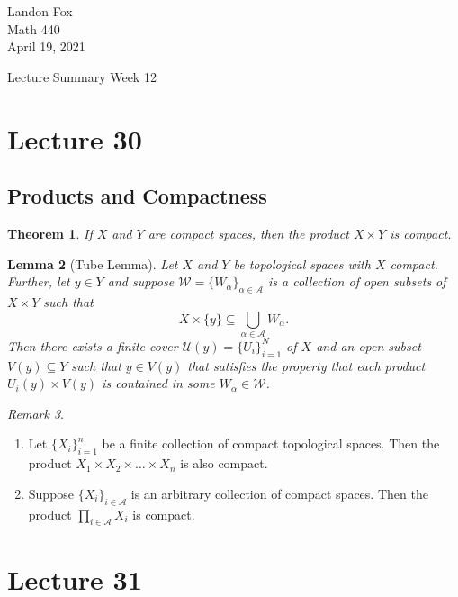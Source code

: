 \documentclass[ 12pt ]{article}
\newcounter{lecture_num}
\theoremstyle{plain}
\theoremstyle{plain}
\newtheorem{theorem}{Theorem}[lecture_num]
\newtheorem{lemma}[theorem]{Lemma}
\theoremstyle{definition}
\theoremstyle{remark}
\newtheorem{remark}[theorem]{Remark}
\begin{document}
\noindent Landon Fox \\
\noindent Math 440 \\
\noindent April 19, 2021

\begin{center}
	\Large Lecture Summary Week 12
\end{center}

\setcounter{lecture_num}{30}
\setcounter{theorem}{0}
\section*{Lecture 30}

\subsection*{Products and Compactness}

\begin{theorem}
	If $X$ and $Y$ are compact spaces, then the product $X \times Y$ is compact.
\end{theorem}

\begin{lemma}[Tube Lemma]
	Let $X$ and $Y$ be topological spaces with $X$ compact. Further, let $y \in Y$ and suppose $\mathcal{W} = \{ W_\alpha \}_{\alpha \in \mathcal{A}}$ is a collection of open subsets of
	$X \times Y$ such that $$X \times \{ y \} \subseteq \bigcup_{\alpha \in \mathcal{A}} W_\alpha.$$ Then there exists a finite cover $\mathcal{U}(y) = \{ U_i \}_{i=1}^N$ of $X$ and an
	open subset $V(y) \subseteq Y$ such that $y \in V(y)$ that satisfies the property that each product $U_i(y) \times V(y)$ is contained in some $W_\alpha \in \mathcal{W}$.
\end{lemma}

\begin{remark} $ $
	\begin{enumerate}
		\item Let $\{ X_i \}_{i=1}^n$ be a finite collection of compact topological spaces. Then the product $X_1 \times X_2 \times \hdots \times X_n$ is also compact.
		\item Suppose $\{ X_i \}_{i \in \mathcal{A}}$ is an arbitrary collection of compact spaces. Then the product $\prod_{i \in \mathcal{A}} X_i$ is compact.
	\end{enumerate}
\end{remark}


\setcounter{lecture_num}{31}
\setcounter{theorem}{0}
\section*{Lecture 31}
\end{document}
